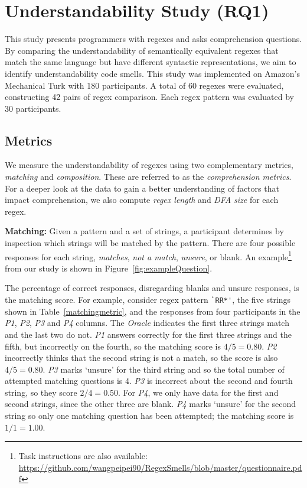 

\section{Understandability Study (RQ1)}
\label{sec:rq1}
This study presents programmers with regexes and asks comprehension questions. By comparing the understandability of semantically equivalent regexes that match the same language but have different syntactic representations, we aim to identify understandability code smells.
This study was implemented on Amazon's Mechanical Turk with 180 participants. A total of 60 regexes were evaluated, constructing 42 pairs of regex comparison. Each regex pattern was evaluated by 30 participants.







\subsection{Metrics}
\label{sec:understadningmetric}
 We measure the understandability of regexes using two complementary metrics, \emph{matching} and \emph{composition}. These are referred to as the \emph{comprehension metrics}.
For a deeper look at the data to gain a better understanding of factors that impact comprehension, we also compute \emph{regex length} and \emph{DFA size} for each regex.


\textbf{Matching:}
 Given a pattern and a set of strings, a participant determines by inspection which strings will be matched by the pattern. There are four possible responses for each string, \emph{matches}, \emph{not a match}, \emph{unsure}, or blank. An example\footnote{Task instructions are also available: \url{https://github.com/wangpeipei90/RegexSmells/blob/master/questionnaire.pdf}} from our study is shown in Figure~\ref{fig:exampleQuestion}.

 The percentage of correct responses, disregarding blanks and unsure responses, is the matching score.
 For example, consider regex pattern \verb!`RR*'!, the five strings shown in Table~\ref{matchingmetric}, and the responses from four participants in the \emph{P1}, \emph{P2}, \emph{P3} and \emph{P4} columns.
 The {\em Oracle} indicates the first three strings match and the last two do not. \emph{P1} answers correctly for the first three strings and the fifth, but incorrectly on the fourth, so the matching score is $4/5 = 0.80$. \emph{P2} incorrectly thinks that the second string is not a match, so the score is also $4/5 = 0.80$. \emph{P3} marks `unsure' for the third string and so the total number of attempted matching questions is 4. \emph{P3} is incorrect about the second and fourth string, so they score $2/4 = 0.50$. For \emph{P4}, we only have data for the first and second strings, since the other three are blank. \emph{P4} marks `unsure' for the second string so only one matching question has been attempted; the matching score is $1/1 = 1.00$.

